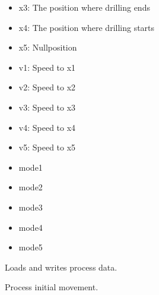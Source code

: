 \documentclass[letterpaper,10pt,english]{sphinxmanual}
\begin{document}
\begin{fulllineitems}
\begin{fulllineitems}
\begin{description}
\begin{itemize}
\item {} 
x3: The position where drilling ends

\item {} 
x4: The position where drilling starts

\item {} 
x5: Nullposition

\item {} 
v1: Speed to x1

\item {} 
v2: Speed to x2

\item {} 
v3: Speed to x3

\item {} 
v4: Speed to x4

\item {} 
v5: Speed to x5

\item {} 
mode1

\item {} 
mode2

\item {} 
mode3

\item {} 
mode4

\item {} 
mode5

\end{itemize}

\end{description}

\end{fulllineitems}


\begin{fulllineitems}
\label{bohrvorrichtung:bohrvorrichtung.Bohrvorrichtung.processDataToDevice}
Loads and writes process data.

\end{fulllineitems}


\begin{fulllineitems}
\label{bohrvorrichtung:bohrvorrichtung.Bohrvorrichtung.sayHello}
Process initial movement.

\end{fulllineitems}


\end{fulllineitems}
\end{document}
